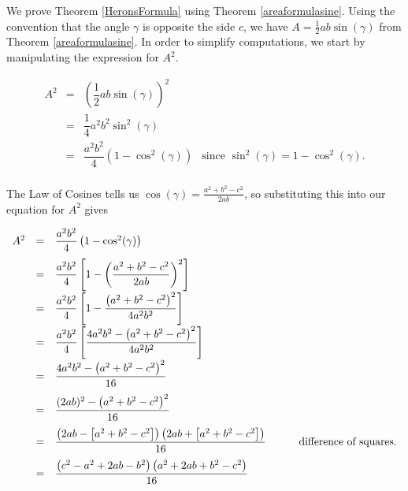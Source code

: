 \smallskip

We prove Theorem \ref{HeronsFormula} using Theorem \ref{areaformulasine}.  Using the convention that the angle $\gamma$ is opposite the side $c$,  we have $A = \frac{1}{2} ab \sin(\gamma)$ from Theorem \ref{areaformulasine}.  In order to simplify computations, we start by manipulating the expression for $A^2$.



\[ \begin{array}{rclr} 

A^2 & = & \left(\dfrac{1}{2} ab \sin(\gamma)\right)^2 &\\[10pt] 
    & =  &  \dfrac{1}{4} a^2 b^2 \sin^{2}(\gamma) & \\[10pt]
    & = & \dfrac{a^2b^2}{4} \left(1 - \cos^{2}(\gamma)\right) & \text{since $\sin^2(\gamma) = 1 - \cos^{2}(\gamma)$.} \\ \end{array}\]

The Law of Cosines tells us $\cos(\gamma) = \frac{a^2 + b^2 - c^2}{2ab}$, so substituting this into our equation for $A^2$ gives

\[ \begin{array}{rclr}

A^2 & = &  \dfrac{a^2b^2}{4} \left(1 - \cos^{2}(\gamma)\right) 	& \text{\hphantom{perfect square trinomials.}}\\[10pt]

    & = & \dfrac{a^2b^2}{4} \left[1 - \left( \dfrac{a^2 + b^2 - c^2}{2ab} \right)^2\right] &  \\ [10pt]
    
	 	& = & \dfrac{a^2b^2}{4} \left[1 - \dfrac{\left(a^2 + b^2 - c^2\right)^2}{4a^2b^2} \right] &  \\ [10pt]
	  
	 	& = & \dfrac{a^2b^2}{4} \left[\dfrac{4a^2 b^2  - \left(a^2 + b^2 - c^2\right)^2}{4a^2b^2} \right] &  \\ [10pt]
	 	
	 	& = & \dfrac{4a^2 b^2  - \left(a^2 + b^2 - c^2\right)^2}{16}  &  \\ [10pt]
	 	
	 	& = & \dfrac{(2ab)^2  - \left(a^2 + b^2 - c^2\right)^2}{16}  &  \\ [10pt]
	 	
	 		& = & \dfrac{\left( 2ab - \left[a^2+b^2 - c^2\right]\right)  \left( 2ab + \left[a^2+b^2 - c^2\right]\right)}{16}  & \text{difference of squares.} \\ [10pt]
	 	 	& = & \dfrac{\left(c^2 - a^2 + 2ab - b^2 \right)\left( a^2 + 2ab + b^2- c^2\right)}{16}  &  \\ [10pt]
	 	\end{array} \]
	 	
